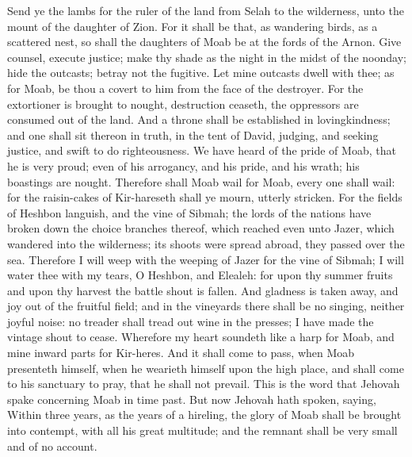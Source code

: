 Send ye the lambs for the ruler of the land from Selah to the wilderness, unto the mount of the daughter of Zion. For it shall be that, as wandering birds, as a scattered nest, so shall the daughters of Moab be at the fords of the Arnon. Give counsel, execute justice; make thy shade as the night in the midst of the noonday; hide the outcasts; betray not the fugitive. Let mine outcasts dwell with thee; as for Moab, be thou a covert to him from the face of the destroyer. For the extortioner is brought to nought, destruction ceaseth, the oppressors are consumed out of the land. And a throne shall be established in lovingkindness; and one shall sit thereon in truth, in the tent of David, judging, and seeking justice, and swift to do righteousness.  We have heard of the pride of Moab, that he is very proud; even of his arrogancy, and his pride, and his wrath; his boastings are nought. Therefore shall Moab wail for Moab, every one shall wail: for the raisin-cakes of Kir-hareseth shall ye mourn, utterly stricken. For the fields of Heshbon languish, and the vine of Sibmah; the lords of the nations have broken down the choice branches thereof, which reached even unto Jazer, which wandered into the wilderness; its shoots were spread abroad, they passed over the sea. Therefore I will weep with the weeping of Jazer for the vine of Sibmah; I will water thee with my tears, O Heshbon, and Elealeh: for upon thy summer fruits and upon thy harvest the battle shout is fallen. And gladness is taken away, and joy out of the fruitful field; and in the vineyards there shall be no singing, neither joyful noise: no treader shall tread out wine in the presses; I have made the vintage shout to cease. Wherefore my heart soundeth like a harp for Moab, and mine inward parts for Kir-heres. And it shall come to pass, when Moab presenteth himself, when he wearieth himself upon the high place, and shall come to his sanctuary to pray, that he shall not prevail.  This is the word that Jehovah spake concerning Moab in time past. But now Jehovah hath spoken, saying, Within three years, as the years of a hireling, the glory of Moab shall be brought into contempt, with all his great multitude; and the remnant shall be very small and of no account. 

